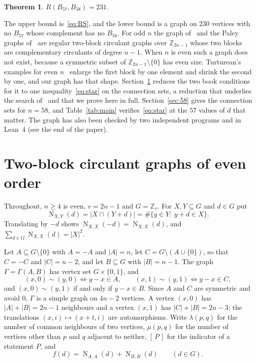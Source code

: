\documentclass[11pt]{amsart}
\newtheorem*{maintheorem}{Theorem}
\theoremstyle{definition}
\theoremstyle{remark}
\numberwithin{equation}{section}
\newcommand{\Z}{\mathbb{Z}}
\newcommand{\NN}{\operatorname{N}}
\newcommand{\ind}[1]{[\,#1\,]}
\begin{document}
\begin{maintheorem}
$R(B_{57},B_{58})=231$.
\end{maintheorem}

The upper bound is~\eqref{eq:RS}, and the lower bound is a graph on $230$ vertices with no $B_{57}$ whose complement has no $B_{58}$. For odd $n$ the graph of~\cite{Bh} and the Paley graphs of~\cite{We} are regular two-block circulant graphs over $\Z_{2n-1}$ whose two blocks are complementary circulants of degree $n-1$. When $n$ is even such a graph does not exist, because a symmetric subset of $\Z_{2n-1}\setminus\{0\}$ has even size. Turturean's examples for even $n$~\cite{Tu} enlarge the first block by one element and shrink the second by one, and our graph has that shape. Section~\ref{sec:blocks} reduces the two book conditions for it to one inequality~\eqref{eq:star} on the connection sets, a reduction that underlies the search of~\cite{Tu} and that we prove here in full. Section~\ref{sec:58} gives the connection sets for $n=58$, and Table~\ref{tab:main} verifies~\eqref{eq:star} at the $57$ values of $d$ that matter. The graph has also been checked by two independent programs and in Lean~4 (see the end of the paper).

\section{Two-block circulant graphs of even order}\label{sec:blocks}

Throughout, $n\ge4$ is even, $v=2n-1$ and $G=\Z_v$. For $X,Y\subseteq G$ and $d\in G$ put
\[
\NN_{X,Y}(d)=|X\cap(Y+d)|=\#\{y\in Y:\ y+d\in X\}.
\]
Translating by $-d$ shows $\NN_{X,X}(-d)=\NN_{X,X}(d)$, and $\sum_{d\in G}\NN_{X,X}(d)=|X|^2$.

Let $A\subseteq G\setminus\{0\}$ with $A=-A$ and $|A|=n$, let $C=G\setminus(A\cup\{0\})$, so that $C=-C$ and $|C|=n-2$, and let $B\subseteq G$ with $|B|=n-1$. The graph $\Gamma=\Gamma(A,B)$ has vertex set $G\times\{0,1\}$, and
\[
(x,0)\sim(y,0)\iff y-x\in A,\qquad (x,1)\sim(y,1)\iff y-x\in C,
\]
and $(x,0)\sim(y,1)$ if and only if $y-x\in B$. Since $A$ and $C$ are symmetric and avoid $0$, $\Gamma$ is a simple graph on $4n-2$ vertices. A vertex $(x,0)$ has $|A|+|B|=2n-1$ neighbours and a vertex $(x,1)$ has $|C|+|B|=2n-3$; the translations $(x,i)\mapsto(x+t,i)$ are automorphisms. Write $\lambda(p,q)$ for the number of common neighbours of two vertices, $\mu(p,q)$ for the number of vertices other than $p$ and $q$ adjacent to neither, $\ind{P}$ for the indicator of a statement $P$, and
\[
f(d)=\NN_{A,A}(d)+\NN_{B,B}(d)\qquad(d\in G).
\]
\end{document}
